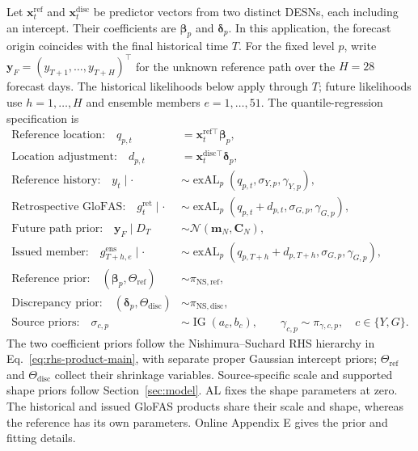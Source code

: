 \documentclass[12pt,letterpaper]{article}
\numberwithin{equation}{section}
\newcommand{\Normal}{\mathcal{N}}
\newcommand{\vect}[1]{\bm{#1}}
\newcommand{\mat}[1]{\bm{#1}}
\DeclareMathOperator{\IG}{IG}
\newcommand{\exAL}{\operatorname{exAL}}
\begin{document}
Let \(\vect x_t^{\mathrm{ref}}\) and \(\vect x_t^{\mathrm{disc}}\) be
predictor vectors from two distinct DESNs, each including an intercept.
Their coefficients are \(\vect\beta_p\) and \(\vect\delta_p\).
In this application, the forecast origin coincides with the final historical
time \(T\). For the fixed level \(p\), write
\(\vect y_F=(y_{T+1},\ldots,y_{T+H})^\top\) for the unknown reference path
over the \(H=28\) forecast days. The historical likelihoods below apply
through \(T\); future likelihoods use \(h=1,\ldots,H\) and ensemble
members \(e=1,\ldots,51\). The quantile-regression specification is
\begin{equation}
\begin{aligned}
\text{Reference location:}\quad
q_{p,t}&=\vect x_t^{\mathrm{ref}\top}\vect\beta_p,\\
\text{Location adjustment:}\quad
d_{p,t}&=\vect x_t^{\mathrm{disc}\top}\vect\delta_p,\\
\text{Reference history:}\quad
y_t\mid\cdot&\sim\exAL_p(q_{p,t},\sigma_{Y,p},\gamma_{Y,p}),\\
\text{Retrospective GloFAS:}\quad
g_t^{\mathrm{ret}}\mid\cdot&\sim
\exAL_p(q_{p,t}+d_{p,t},\sigma_{G,p},\gamma_{G,p}),\\
\text{Future path prior:}\quad
\vect y_F\mid D_T&\sim\Normal(\vect m_N,\mat C_N),\\
\text{Issued member:}\quad
g_{T+h,e}^{\mathrm{ens}}\mid\cdot&\sim
\exAL_p(q_{p,T+h}+d_{p,T+h},\sigma_{G,p},\gamma_{G,p}),\\
\text{Reference prior:}\quad
(\vect\beta_p,\Theta_{\mathrm{ref}})&\sim\pi_{\mathrm{NS,ref}},\\
\text{Discrepancy prior:}\quad
(\vect\delta_p,\Theta_{\mathrm{disc}})&\sim\pi_{\mathrm{NS,disc}},\\
\text{Source priors:}\quad
\sigma_{c,p}&\sim\IG(a_c,b_c),\qquad
\gamma_{c,p}\sim\pi_{\gamma,c,p},\quad c\in\{Y,G\}.
\end{aligned}
\label{eq:glofas-part4-main}
\end{equation}
The two coefficient priors follow the Nishimura--Suchard RHS hierarchy in
Eq.~\eqref{eq:rhs-product-main}, with separate proper Gaussian intercept
priors; \(\Theta_{\mathrm{ref}}\) and \(\Theta_{\mathrm{disc}}\) collect
their shrinkage variables. Source-specific scale and supported shape priors
follow Section~\ref{sec:model}. AL fixes the shape parameters at zero.
The historical and issued GloFAS products share their scale and shape,
whereas the reference has its own parameters. Online Appendix E gives the
prior and fitting details.
\end{document}
